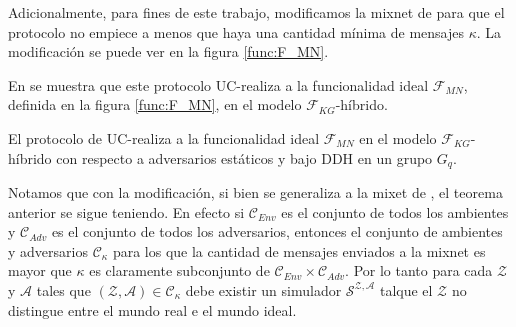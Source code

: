 Adicionalmente, para fines de este trabajo, modificamos la mixnet de \cite{Wikstrom04a} para que el protocolo
no empiece a menos que haya una cantidad mínima de mensajes $\kappa$. La modificación se puede ver en 
la figura \ref{func:F_MN}. 

En \cite{mnCompleto} se muestra que este protocolo UC-realiza a la funcionalidad ideal $\mathcal{F}_{MN}$,
definida en la figura \ref{func:F_MN}, en el modelo $\mathcal{F}_{KG}$-híbrido. 

\begin{teorema}
El protocolo de \cite{Wikstrom04a} UC-realiza a la funcionalidad ideal $\mathcal{F}_{MN}$
en el modelo $\mathcal{F}_{KG}$-híbrido con respecto a adversarios estáticos y bajo DDH en un grupo
$G_q$.
\label{teo:mn}
\end{teorema}

Notamos que con la modificación, si bien se generaliza a la mixet de \cite{Wikstrom04a}, el teorema anterior
se sigue teniendo. En efecto si $\mathcal{C}_{Env}$ es el conjunto
de todos los ambientes y $\mathcal{C}_{Adv}$ es el conjunto de todos los adversarios, entonces el conjunto
de ambientes y adversarios $\mathcal{C}_{\kappa}$ para los que la cantidad de mensajes enviados a la mixnet
es mayor que $\kappa$ es claramente subconjunto de $\mathcal{C}_{Env}\times\mathcal{C}_{Adv}$. Por lo tanto
para cada $\mathcal{Z}$ y $\mathcal{A}$ tales que $(\mathcal{Z}, \mathcal{A}) \in \mathcal{C}_\kappa$ debe
existir un simulador $\mathcal{S^{Z, A}}$ talque el $\mathcal{Z}$ no distingue entre el mundo real e el
mundo ideal.

